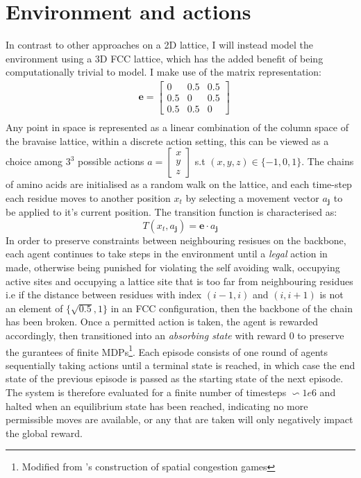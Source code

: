 \section{Environment and actions}
In contrast to other approaches on a 2D lattice, I will instead 
model the environment using a 3D FCC lattice, which has the added benefit of
being computationally trivial to model. I make use of the
matrix representation:
\begin{equation}
    \begin{split}
        & \mathbf{e} = \begin{bmatrix}
            0 & 0.5 & 0.5 \\
            0.5 & 0 & 0.5 \\
            0.5 & 0.5 & 0
        \end{bmatrix} \\
    \end{split}
\end{equation}
Any point in space is represented as a linear combination of the
column space of the bravaise lattice, within a discrete action setting,
this can be viewed as a choice among $3^3$ possible actions $ a = \begin{bmatrix}
    x \\ y \\ z
\end{bmatrix}$ s.t $(x,y,z) \in \{-1,0,1 \}$.
The chains of amino acids are initialised as a random walk on the lattice, and each
time-step each residue moves to another position $x_t$ by selecting a movement vector
$a_{\mathbf{j}}$ to be applied to it's current position. The transition function
is characterised as:
\begin{equation}
    T(x_t, a_{\mathbf{j}}) =\mathbf{e} \cdot a_{\mathbf{j}}
\end{equation}
In order to preserve constraints between neighbouring resisues on the backbone, each agent
continues to take steps in the environment until a \emph{legal} action in made, otherwise
being punished for violating the self avoiding walk, occupying active sites and occupying a lattice site that is 
too far from neighbouring residues i.e if the distance between residues with index $(i-1, i)$
and $(i, i+1)$ is not an element of $\{\sqrt{0.5}, 1\}$ in an FCC configuration, then the backbone
of the chain has been broken. Once a permitted action is taken, the agent is rewarded accordingly,
then transitioned into an \emph{absorbing state} with reward 0 to preserve the gurantees of finite MDPs\footnote{Modified from \cite{Mguni2018}'s construction of spatial congestion games}.
Each episode consists of one round of agents sequentially taking actions until a terminal state is reached,
in which case the end state of the previous episode is passed as the starting state of the next episode. The
system is therefore evaluated for a finite number of timesteps $\backsim 1e6$ and halted when an equilibrium
state has been reached, indicating no more permissible moves are available, or any that are taken will only negatively
impact the global reward.
